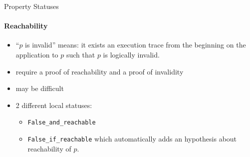 
\begin{frame}{Property Statuses}
\framesubtitle{Reachability}

\begin{itemize}
\item ``$p$ is invalid'' means: it exists an execution trace from the beginning
  on the application to $p$ such that $p$ is logically invalid.
\item require a proof of reachability and a proof of invalidity
\item may be difficult
\item 2 different local statuses: 
  \begin{itemize}
  \item \lstinline+False_and_reachable+
  \item \lstinline+False_if_reachable+ which automatically adds an hypothesis
    about reachability of $p$.
  \end{itemize}
\end{itemize}

\end{frame}
